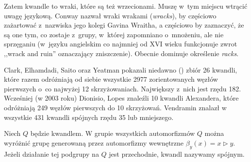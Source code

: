 Zatem kwandle to wraki, które są też wrzecionami.
Muszę w~tym miejscu wtrącić uwagę językową.
Conway nazwał wraki wrakami (\emph{wracks}), by częściowo zażartować z~nazwiska jego kolegi Gavina Wraitha, a częściowo by zaznaczyć, że są one tym, co zostaje z~grupy, w~której zapomniano o~mnożeniu, ale nie sprzęganiu (w~języku angielskim co najmniej od XVI wieku funkcjonuje zwrot ,,wrack and ruin'' oznaczający zniszczenie).
Obecnie dominuje określenie \emph{racks}.


Clark, Elhamdadi, Saito oraz Yeatman pokazali niedawno (\cite{clark13}) zbiór 26 kwandli, które razem odróżniają od siebie wszystkie 2977 zorientowanych węzłów pierwszych o~co najwyżej 12 skrzyżowaniach.
Największy z~nich jest rzędu 182.
Wcześniej (w 2003 roku) Dionisio, Lopes znaleźli 10 kwandli Alexandera, które odróżniają 249 węzłów pierwszych do 10 skrzyżowań.
Vendramin znalazł w \cite{vendramin12} wszystkie 431 kwandli spójnych rzędu 35 lub mniejszego.

\begin{definition}
    Niech $Q$ będzie kwandlem.
    W grupie wszystkich automorfizmów $Q$ można wyróżnić grupę generowaną przez automorfizmy wewnętrzne $\beta_y(x) = x \triangleright y$.
    Jeżeli działanie tej podgrupy na $Q$ jest przechodnie, kwandl nazywamy spójnym.
\end{definition}


